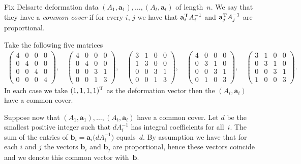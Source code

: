\begin{Definition}
Fix Delsarte deformation data $(A_1,\mathbf{a}_1), \dots, (A_t,\mathbf{a}_t)$ of length~$n$. We say that they have a \emph{common cover}
if for every $i$, $j$ we have that $\mathbf{a}^{\rm T}_i A_i^{-1}$ and $\mathbf{a}^{\rm T}_j A_j^{-1}$ are proportional.
\end{Definition}
\begin{Example} Take the following f\/ive matrices
\begin{gather*}
\left(\begin{matrix} 4&0&0&0\\0&4&0&0\\0&0&4&0\\0&0&0&4\end{matrix} \right)\!,\quad
\left(\begin{matrix} 4&0&0&0\\0&4&0&0\\0&0&3&1\\0&0&1&3\end{matrix} \right)\!,\quad
\left(\begin{matrix} 3&1&0&0\\1&3&0&0\\0&0&3&1\\0&0&1&3\end{matrix} \right)\!,\quad
\left(\begin{matrix} 4&0&0&0\\0&3&1&0\\0&0&3&1\\0&1&0&3\end{matrix} \right)\!,\quad
\left(\begin{matrix} 3&1&0&0\\0&3&1&0\\0&0&3&1\\1&0&0&3\end{matrix} \right)\!.
\end{gather*}
In each case we take $(1,1,1,1)^{\rm T}$ as the deformation vector then the $(A_i,\mathbf{a}_i)$ have a common cover.
\end{Example}

Suppose now that $(A_1,\mathbf{a}_1),\dots,(A_t,\mathbf{a}_t)$ have a common cover. Let $d$ be the smallest positive integer such that $dA_i^{-1}$ has integral coef\/f\/icients for all~$i$. The sum of the entries of $\mathbf{b}_i=\mathbf{a}_i \big(dA_i^{-1}\big)$ equals~$d$. By assumption we have that for each $i$ and $j$ the vectors $\mathbf{b}_i$ and $\mathbf{b}_j$ are proportional, hence these vectors coincide and we denote this common vector with~$\mathbf{b}$.

